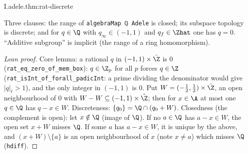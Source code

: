 \begin{theorem}[$\Q$ is discrete in $\A$]
\end{theorem}
\begin{tfformal}{I.adele.thm:rat-discrete}
\begin{tffidelity}
Three clauses: the range of \texttt{algebraMap ℚ Adele} is closed; its subspace topology is discrete; and for $q\in\Q$ with $q_\infty\in(-1,1)$ and $q_f\in\Zhat$ one has $q=0$. ``Additive subgroup'' is implicit (the range of a ring homomorphism).
\end{tffidelity}
\end{tfformal}
\begin{proof}[Lean proof]
Core lemma: a rational $q$ in $(-1,1)\times\hat\Z$ is $0$ (\texttt{rat\_eq\_zero\_of\_mem\_box}): $q\in\Z_p$ for all $p$ forces $q\in\Z$ (\texttt{rat\_isInt\_of\_forall\_padicInt}: a prime dividing the denominator would give $|q|_\ell>1$), and the only integer in $(-1,1)$ is $0$. Put $W=(-\tfrac12,\tfrac12)\times\hat\Z$, an open neighbourhood of $0$ with $W-W\subseteq(-1,1)\times\hat\Z$; then for $x\in\A$ at most one $q\in\Q$ has $q-x\in W$. Discreteness: $\{q_0\}=\Q\cap(q_0+W)$. Closedness (the complement is open): let $x\notin\Q$ (image of $\Q$). If no $a\in\Q$ has $a-x\in W$, the open set $x+W$ misses $\Q$. If some $a$ has $a-x\in W$, it is unique by the above, and $(x+W)\setminus\{a\}$ is an open neighbourhood of $x$ (note $x\ne a$) which misses $\Q$ (\texttt{hdiff}).
\end{proof}

